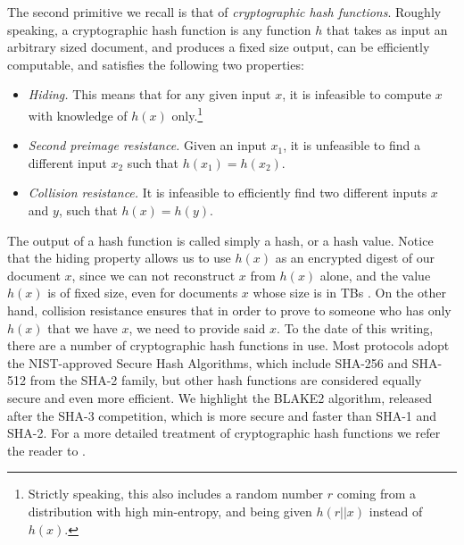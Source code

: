 The second primitive we recall is that of {\em cryptographic hash functions}. Roughly speaking, a cryptographic hash function is any function $h$ that takes as input an arbitrary sized document, and produces a fixed size output, can be efficiently computable, and satisfies the following two properties:
\begin{itemize}
\item {\em Hiding.} This means that for any given input $x$, it is infeasible to compute $x$ with knowledge of $h(x)$ only.\footnote{Strictly speaking, this also includes a random number $r$ coming from a distribution with high min-entropy, and being given $h(r||x)$ instead of $h(x)$.}
\item {\em Second preimage resistance.} Given an input $x_1$, it is unfeasible to find a different input $x_2$ such that $h(x_1)=h(x_2)$.
\item {\em Collision resistance.} It is infeasible to efficiently find two different inputs $x$ and $y$, such that $h(x)=h(y)$.
\end{itemize}
The output of a hash function is called simply a hash, or a hash value. Notice that the hiding property allows us to use $h(x)$ as an encrypted digest of our document $x$, since we can not reconstruct $x$ from $h(x)$ alone, and the value $h(x)$ is of fixed size, even for documents $x$ whose size is in TBs . On the other hand, collision resistance ensures that in order to prove to someone who has only $h(x)$ that we have $x$, we need to provide said $x$. To the date of this writing, there are a number of cryptographic hash functions in use. Most protocols adopt the NIST-approved Secure Hash Algorithms\cite{sha_standard}, which include SHA-256 and SHA-512 from the SHA-2 family, but other hash functions are considered equally secure and even more efficient. We highlight the BLAKE2 algorithm, released after the SHA-3 competition, which is more secure and faster than SHA-1 and SHA-2. For a more detailed treatment of cryptographic hash functions we refer the reader to \cite{sha_standard,aumasson,sha3zoo,bitcoinbook}. 

